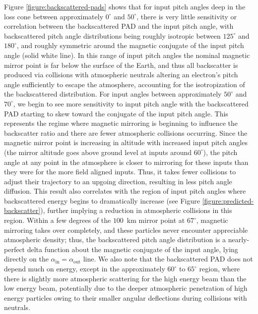 \documentclass[draft]{agujournal2019}
\newcommand{\mathdeg}{^\circ}
\begin{document}
Figure \ref{figure:backscattered-pads} shows that for input pitch angles deep in the loss cone between approximately $0\mathdeg$ and $50 \mathdeg$, there is very little sensitivity or correlation between the backscattered PAD and the input pitch angle, with backscattered pitch angle distributions being roughly isotropic between $125\mathdeg$ and $180\mathdeg$, and roughly symmetric around the magnetic conjugate of the input pitch angle (solid white line). In this range of input pitch angles the nominal magnetic mirror point is far below the surface of the Earth, and thus all backscatter is produced via collisions with atmospheric neutrals altering an electron's pitch angle sufficiently to escape the atmosphere, accounting for the isotropization of the backscattered distribution. For input angles between approximately $50\mathdeg$ and $70\mathdeg$, we begin to see more sensitivity to input pitch angle with the backscattered PAD starting to skew toward the conjugate of the input pitch angle. This represents the regime where magnetic mirroring is beginning to influence the backscatter ratio and there are fewer atmospheric collisions occurring. Since the magnetic mirror point is increasing in altitude with increased input pitch angles (the mirror altitude goes above ground level at inputs around $60\mathdeg$), the pitch angle at any point in the atmosphere is closer to mirroring for these inputs than they were for the more field aligned inputs. Thus, it takes fewer collisions to adjust their trajectory to an upgoing direction, resulting in less pitch angle diffusion. This result also correlates with the region of input pitch angles where backscattered energy begins to dramatically increase (see Figure \ref{figure:predicted-backscatter}), further implying a reduction in atmospheric collisions in this region. Within a few degrees of the $100$~km mirror point at $67\mathdeg$, magnetic mirroring takes over completely, and these particles never encounter appreciable atmospheric density; thus, the backscattered pitch angle distribution is a nearly-perfect delta function about the magnetic conjugate of the input angle, lying directly on the $\alpha_\text{in} = \alpha_\text{out}$ line. We also note that the backscattered PAD does not depend much on energy, except in the approximately $60\mathdeg$ to $65\mathdeg$ region, where there is slightly more atmospheric scattering for the high energy beam than the low energy beam, potentially due to the deeper atmospheric penetration of high energy particles owing to their smaller angular deflections during collisions with neutrals.
\end{document}
